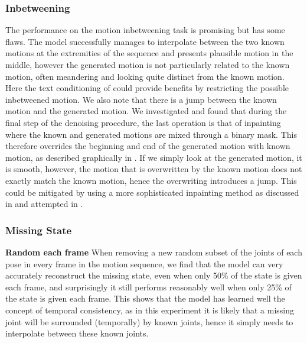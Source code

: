 \subsubsection{Inbetweening}
\label{sec:diffusion_baseline_inbetweening}

The performance on the motion inbetweening task is promising but has some flaws. The model successfully manages to interpolate between the two known motions at the extremities of the sequence and presents plausible motion in the middle, however the generated motion is not particularly related to the known motion, often meandering and looking quite distinct from the known motion. Here the text conditioning of \cite{MDM} could provide benefits by restricting the possible inbetweened motion. We also note that there is a jump between the known motion and the generated motion. We investigated and found that during the final step of the denoising procedure, the last operation is that of inpainting where the known and generated motions are mixed through a binary mask. This therefore overrides the beginning and end of the generated motion with known motion, as described graphically in . If we simply look at the generated motion, it is smooth, however, the motion that is overwritten by the known motion does not exactly match the known motion, hence the overwriting introduces a jump. This could be mitigated by using a more sophisticated inpainting method as discussed in  and attempted in .

\subsubsection{Missing State}
\textbf{Random each frame}
When removing a new random subset of the joints of each pose in every frame in the motion sequence, we find that the model can very accurately reconstruct the missing state, even when only 50\% of the state is given each frame, and surprisingly it still performs reasonably well when only 25\% of the state is given each frame. This shows that the model has learned well the concept of temporal consistency, as in this experiment it is likely that a missing joint will be surrounded (temporally) by known joints, hence it simply needs to interpolate between these known joints.


